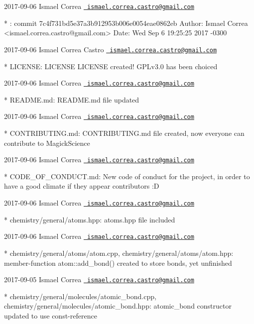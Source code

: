  2017-\/09-\/06 Ismael Correa \href{mailto:ismael.correa.castro@gmail.com}{\texttt{ ismael.\+correa.\+castro@gmail.\+com}} \begin{DoxyVerb}* : commit 7c4f731bd5e37a3b912953b006e0054eae0862eb Author: Ismael
Correa <ismael.correa.castro@gmail.com> Date:   Wed Sep 6 19:25:25
2017 -0300
\end{DoxyVerb}
 2017-\/09-\/06 Ismael Correa Castro \href{mailto:ismael.correa.castro@gmail.com}{\texttt{ ismael.\+correa.\+castro@gmail.\+com}} \begin{DoxyVerb}* LICENSE: LICENSE LICENSE created! GPLv3.0 has been choiced
\end{DoxyVerb}
 2017-\/09-\/06 Ismael Correa \href{mailto:ismael.correa.castro@gmail.com}{\texttt{ ismael.\+correa.\+castro@gmail.\+com}} \begin{DoxyVerb}* README.md: README.md file updated
\end{DoxyVerb}
 2017-\/09-\/06 Ismael Correa \href{mailto:ismael.correa.castro@gmail.com}{\texttt{ ismael.\+correa.\+castro@gmail.\+com}} \begin{DoxyVerb}* CONTRIBUTING.md: CONTRIBUTING.md file created, now everyone can
contribute to MagickScience
\end{DoxyVerb}
 2017-\/09-\/06 Ismael Correa \href{mailto:ismael.correa.castro@gmail.com}{\texttt{ ismael.\+correa.\+castro@gmail.\+com}} \begin{DoxyVerb}* CODE_OF_CONDUCT.md: New code of conduct for the project, in order
to have a good climate if they appear contributors :D
\end{DoxyVerb}
 2017-\/09-\/06 Ismael Correa \href{mailto:ismael.correa.castro@gmail.com}{\texttt{ ismael.\+correa.\+castro@gmail.\+com}} \begin{DoxyVerb}* chemistry/general/atoms.hpp: atoms.hpp file included
\end{DoxyVerb}
 2017-\/09-\/06 Ismael Correa \href{mailto:ismael.correa.castro@gmail.com}{\texttt{ ismael.\+correa.\+castro@gmail.\+com}} \begin{DoxyVerb}* chemistry/general/atoms/atom.cpp,
chemistry/general/atoms/atom.hpp: member-function atom::add_bond()
created to store bonds, yet unfinished
\end{DoxyVerb}
 2017-\/09-\/05 Ismael Correa \href{mailto:ismael.correa.castro@gmail.com}{\texttt{ ismael.\+correa.\+castro@gmail.\+com}} \begin{DoxyVerb}* chemistry/general/molecules/atomic_bond.cpp,
chemistry/general/molecules/atomic_bond.hpp: atomic_bond constructor
updated to use const-reference
\end{DoxyVerb}
